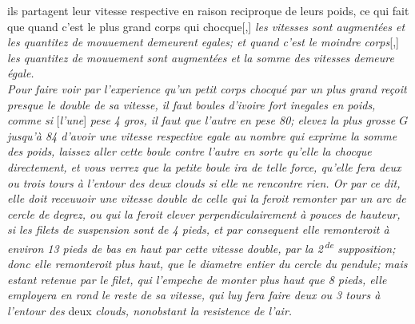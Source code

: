 {{ils partagent leur vitesse respective en raison reciproque de leurs poids,
ce qui fait que quand c'est le plus grand corps qui chocque}[,]
\textit{les vitesses sont augmentées
et les quantitez de mouuement demeurent egales;
et quand c'est le moindre corps}[,]
\textit{les quantitez de mouuement\protect{}
sont augmentées et la somme des vitesses demeure égale.
%
\count{}
\count{}
\count{}
\\%
\hspace*{7,5mm}%
Pour faire voir par l'experience qu'un petit corps
chocqué par un plus grand re\c{c}oit presque le double de sa vitesse,\protect{}
il faut 
boules d'ivoire\protect{} fort inegales en poids,\protect{}
comme} 
\textit{si} [\textit{l'une}]
\textit{pese 4 gros, il faut que l'autre en pese 80;
elevez la plus grosse $\displaystyle G$ jusqu'à 84
d'avoir une vitesse respective\protect{}
egale au nombre qui exprime la somme des poids,
laissez aller cette boule contre l'autre\protect{}
en sorte qu'elle la chocque directement,
et vous verrez que la petite boule ira de telle force,\protect{}
qu'elle fera deux ou trois tours à l'entour des deux clouds
si elle ne rencontre rien.
Or par ce 
dit, elle doit receuuoir une vitesse double de celle
qui la feroit remonter par un arc de cercle de}
\textit{degrez, ou qui la feroit elever perpendiculairement à
pouces de hauteur,
si les filets de suspension sont de 4 pieds,
et par consequent elle remonteroit à environ 13 pieds
de bas en haut par cette vitesse double,
par la 2\textsuperscript{\,de} supposition;
donc elle remonteroit plus haut,
que le diametre entier du cercle du pendule;
mais estant retenue par le filet,
qui l'empeche de monter plus haut que 8 pieds,
elle employera en rond le reste de sa vitesse,\protect{}
qui luy fera faire deux ou 3 tours à l'entour des}
deux \textit{clouds,
nonobstant la resistence de l'air.}%
}{}
